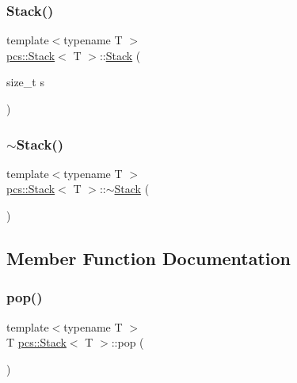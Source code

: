 \subsubsection{\texorpdfstring{Stack()}{Stack()}}
{\footnotesize\ttfamily template$<$typename T $>$ \\
\hyperlink{classpcs_1_1Stack}{pcs\+::\+Stack}$<$ T $>$\+::\hyperlink{classpcs_1_1Stack}{Stack} (\begin{DoxyParamCaption}\item[{size\+\_\+t}]{s }\end{DoxyParamCaption})\hspace{0.3cm}{\ttfamily [inline]}}

\mbox{\label{classpcs_1_1Stack_a11dba3346cd62b56de0d9657ad309b7e}} 
\subsubsection{\texorpdfstring{$\sim$\+Stack()}{~Stack()}}
{\footnotesize\ttfamily template$<$typename T $>$ \\
\hyperlink{classpcs_1_1Stack}{pcs\+::\+Stack}$<$ T $>$\+::$\sim$\hyperlink{classpcs_1_1Stack}{Stack} (\begin{DoxyParamCaption}{ }\end{DoxyParamCaption})\hspace{0.3cm}{\ttfamily [inline]}}



\subsection{Member Function Documentation}
\mbox{\label{classpcs_1_1Stack_a8ef82fe8c94663b393b69f1ded8f975b}} 
\subsubsection{\texorpdfstring{pop()}{pop()}}
{\footnotesize\ttfamily template$<$typename T $>$ \\
T \hyperlink{classpcs_1_1Stack}{pcs\+::\+Stack}$<$ T $>$\+::pop (\begin{DoxyParamCaption}{ }\end{DoxyParamCaption})}

